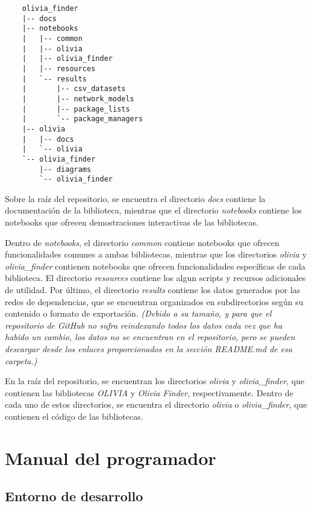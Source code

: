 \begin{verbatim}
    olivia_finder
    |-- docs
    |-- notebooks
    |   |-- common
    |   |-- olivia
    |   |-- olivia_finder
    |   |-- resources
    |   `-- results
    |       |-- csv_datasets
    |       |-- network_models
    |       |-- package_lists
    |       `-- package_managers
    |-- olivia
    |   |-- docs
    |   `-- olivia
    `-- olivia_finder
        |-- diagrams
        `-- olivia_finder
    \end{verbatim}


Sobre la raíz del repositorio, se encuentra el directorio \textit{docs} contiene la documentación de la biblioteca, mientras que el directorio \textit{notebooks}
contiene los notebooks que ofrecen demostraciones interactivas de las bibliotecas.

Dentro de \textit{notebooks}, el directorio \textit{common} contiene notebooks que ofrecen funcionalidades comunes
a ambas bibliotecas, mientras que los directorios \textit{olivia} y \textit{olivia\_finder} contienen notebooks
que ofrecen funcionalidades específicas de cada biblioteca.
El directorio \textit{resources} contiene los algun scripts
y recursos adicionales de utilidad. Por último, el directorio \textit{results} contiene los datos generados por las
redes de dependencias, que se encuentran organizados en subdirectorios según su contenido o formato de exportación. \textit{(Debido a su tamaño, y para que el repositorio de 
GitHub no sufra reindexando todos los datos cada vez que ha habido un cambio, los datos no se encuentran en el repositorio, pero se pueden descargar desde 
los enlaces proporcionados en la sección README.md de esa carpeta.)}

En la raíz del repositorio, se encuentran los directorios \textit{olivia} y \textit{olivia\_finder}, que contienen
las bibliotecas \textit{OLIVIA} y \textit{Olivia Finder}, respectivamente. Dentro de cada uno de estos directorios, se encuentra
el directorio \textit{olivia} o \textit{olivia\_finder}, que contienen el código de las bibliotecas.


\section{Manual del programador}

\subsection{Entorno de desarrollo}


